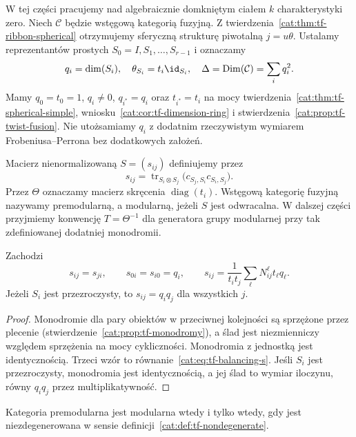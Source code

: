W tej części pracujemy nad algebraicznie domkniętym ciałem $k$ charakterystyki zero. Niech $\mathcal C$ będzie wstęgową kategorią fuzyjną. Z twierdzenia~\ref{cat:thm:tf-ribbon-spherical} otrzymujemy sferyczną strukturę piwotalną $j=u\theta$. Ustalamy reprezentantów prostych $S_0=I,S_1,\ldots,S_{r-1}$ i oznaczamy
\[
 q_i=\dim(S_i),\quad \theta_{S_i}=t_i\id_{S_i},\quad
 \Delta=\operatorname{Dim}(\mathcal C)=\sum_i q_i^2.
\]
Mamy $q_0=t_0=1$, $q_i\neq0$, $q_{i^*}=q_i$ oraz $t_{i^*}=t_i$ na mocy twierdzenia~\ref{cat:thm:tf-spherical-simple}, wniosku~\ref{cat:cor:tf-dimension-ring} i stwierdzenia~\ref{cat:prop:tf-twist-fusion}. Nie utożsamiamy $q_i$ z dodatnim rzeczywistym wymiarem Frobeniusa--Perrona bez dodatkowych założeń.

\begin{definicja}\label{cat:def:tf-modular-s}
Macierz nienormalizowaną $S=(s_{ij})$ definiujemy przez
\[
 s_{ij}=\operatorname{tr}_{S_i\otimes S_j}
 \bigl(c_{S_j,S_i}c_{S_i,S_j}\bigr).
\]
Przez $\Theta$ oznaczamy macierz skręcenia $\operatorname{diag}(t_i)$. Wstęgową kategorię fuzyjną nazywamy premodularną, a modularną, jeżeli $S$ jest odwracalna. W dalszej części przyjmiemy konwencję $T=\Theta^{-1}$ dla generatora grupy modularnej przy tak zdefiniowanej dodatniej monodromii.
\end{definicja}

\begin{stwierdzenie}\label{cat:prop:tf-s-basic}
Zachodzi
\[
 s_{ij}=s_{ji},\qquad s_{0i}=s_{i0}=q_i,\qquad
 s_{ij}=\frac{1}{t_it_j}\sum_\ell N_{ij}^{\ell}t_\ell q_\ell.
\]
Jeżeli $S_i$ jest przezroczysty, to $s_{ij}=q_iq_j$ dla wszystkich $j$.
\end{stwierdzenie}
\begin{proof}
Monodromie dla pary obiektów w przeciwnej kolejności są sprzężone przez plecenie (stwierdzenie~\ref{cat:prop:tf-monodromy}), a ślad jest niezmienniczy względem sprzężenia na mocy cykliczności. Monodromia z jednostką jest identycznością. Trzeci wzór to równanie~\eqref{cat:eq:tf-balancing-s}. Jeśli $S_i$ jest przezroczysty, monodromia jest identycznością, a jej ślad to wymiar iloczynu, równy $q_iq_j$ przez multiplikatywność.
\end{proof}

\begin{twierdzenie}\label{cat:thm:tf-modular-criterion}
Kategoria premodularna jest modularna wtedy i tylko wtedy, gdy jest niezdegenerowana w sensie definicji~\ref{cat:def:tf-nondegenerate}.
\end{twierdzenie}

